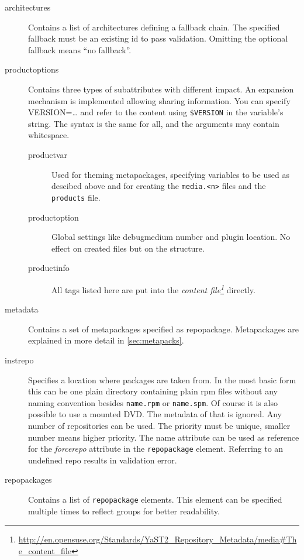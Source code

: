 \begin{description}

  \item[architectures]{%

    Contains a list of architectures defining a fallback chain. The specified fallback must be an
    existing id to pass validation. Omitting the optional fallback means ``no fallback''.
  }

  \item[productoptions]{%

    Contains three types of subattributes with different impact.
    An expansion mechanism is implemented allowing sharing information. You can specify VERSION=\dots
    and refer to the content using \texttt{\$VERSION} in the variable's string.
    The syntax is the same for all, and the arguments may contain whitespace.
    \begin{description}
      \item[productvar]{%

	Used for theming metapackages, specifying variables to be used as descibed above and for creating
	the \texttt{media.<n>} files and the \texttt{products} file.
      }
      \item[productoption]{%

	Global settings like debugmedium number and plugin location. No effect on created files but on the structure.
      }
      \item[productinfo]{%

	All tags listed here are put into the \textit{content file\footnote{\href{http://en.opensuse.org/Standards/YaST2\_Repository\_Metadata/media\#The\_content\_file}{http://en.opensuse.org/Standards/YaST2\_Repository\_Metadata/media\#The\_content\_file}}} directly.
      }
    \end{description}
  }

  \item[metadata]{%
    Contains a set of metapackages specified as repopackage. Metapackages are explained in more detail in \vref{sec:metapacks}.
  }

  \item[instrepo]{%
    Specifies a location where packages are taken from. In the most basic form this can be one plain directory containing
    plain rpm files without any naming convention besides \texttt{name.rpm} or \texttt{name.spm}. Of course it is also
    possible to use a mounted DVD. The metadata of that is ignored.
    Any number of repositories can be used. The priority must be unique, smaller number means higher priority. The name attribute
    can be used as reference for the \textit{force\-repo} attribute in the \texttt{repopackage} element. Referring to an undefined
    repo results in validation error.
  }

  \item[repopackages]{%
    Contains a list of \texttt{repopackage} elements. This element can be specified multiple times to reflect groups
    for better readability.
  }

\end{description}



